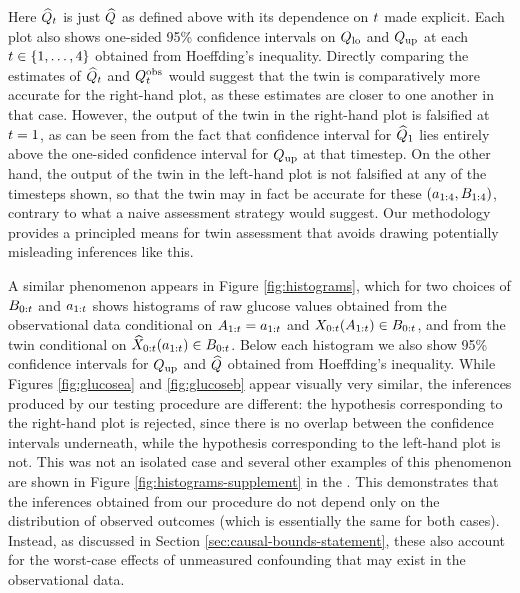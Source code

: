Here $\widehat{Q}_t$ is just $\widehat{Q}$ as defined above with its dependence on $t$ made explicit.
Each plot also shows one-sided 95\% confidence intervals on $Q_{\mathrm{lo}}$ and $Q_{\mathrm{up}}$ at each $t \in \{1, \ldots, 4\}$ obtained from Hoeffding's inequality. 
Directly comparing the estimates of $\widehat{Q}_t$ and $Q^{\textup{obs}}_t$ would suggest that the twin is comparatively more accurate for the right-hand plot, as these estimates are closer to one another in that case.
However, the output of the twin in the right-hand plot is falsified at $t = 1$, as can be seen from the fact that confidence interval for $\widehat{Q}_1$ lies entirely above the one-sided confidence interval for $Q_{\mathrm{up}}$ at that timestep.
On the other hand, the output of the twin in the left-hand plot is not falsified at any of the timesteps shown, so that the twin may in fact be accurate for these $(a_{1:4}, B_{1:4})$, contrary to what a naive assessment strategy would suggest.
Our methodology provides a principled means for twin assessment that avoids drawing potentially misleading inferences like this.


A similar phenomenon appears in Figure \ref{fig:histograms}, which for two choices of $B_{0:t}$ and $a_{1:t}$ shows histograms of raw glucose values obtained from the observational data conditional on $A_{1:t}=a_{1:t}$ and $X_{0:t}(A_{1:t})\in B_{0:t}$, and from the twin conditional on $\widehat{X}_{0:t}(a_{1:t})\in B_{0:t}$.
Below each histogram we also show 95\% confidence intervals for $Q_{\mathrm{up}}$ and $\widehat{Q}$ obtained from Hoeffding's inequality.
While Figures \ref{fig:glucosea} and \ref{fig:glucoseb} appear visually very similar, the inferences produced by our testing procedure are different: the hypothesis corresponding to the right-hand plot is rejected, since there is no overlap between the confidence intervals underneath, while the hypothesis corresponding to the left-hand plot is not.
This was not an isolated case and several other examples of this phenomenon are shown in Figure \ref{fig:histograms-supplement} in the \AppendixName. 
This demonstrates that the inferences obtained from our procedure do not depend only on the distribution of observed outcomes (which is essentially the same for both cases).
Instead, as discussed in Section \ref{sec:causal-bounds-statement}, these also account for the worst-case effects of unmeasured confounding that may exist in the observational data.

